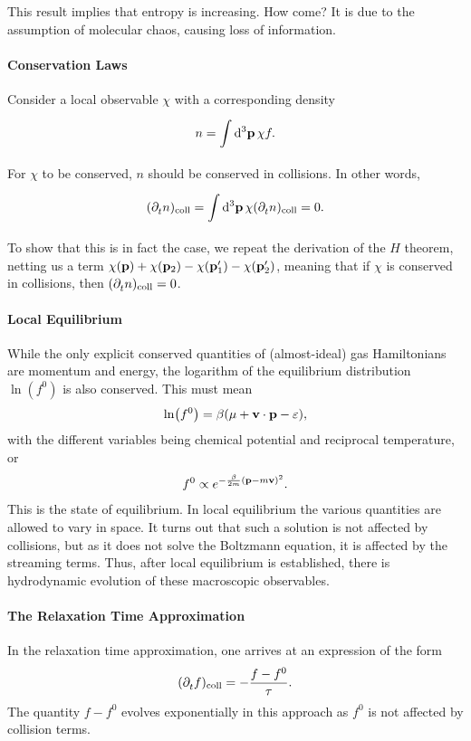 This result implies that entropy is increasing. How come? It is due to the assumption of molecular chaos, causing loss of information.

\paragraph{Conservation Laws}
Consider a local observable $\chi$ with a corresponding density
\begin{align*}
	n = \int\limits_{}^{}\dd[3]{\vb{p}}\chi f.
\end{align*}
For $\chi$ to be conserved, $n$ should be conserved in collisions. In other words,
\begin{align*}
	(\partial^{}_{t}{n})_{\text{coll}} = \int\limits_{}^{}\dd[3]{\vb{p}}\chi (\partial^{}_{t}{n})_{\text{coll}} = 0.
\end{align*}
To show that this is in fact the case, we repeat the derivation of the $H$ theorem, netting us a term $\chi(\vb{p}) + \chi(\vb{p}_{2}) - \chi(\vb{p}_{1}^{\prime}) - \chi(\vb{p}_{2}^{\prime})$, meaning that if $\chi$ is conserved in collisions, then $(\partial^{}_{t}{n})_{\text{coll}} = 0$.

\paragraph{Local Equilibrium}
While the only explicit conserved quantities of (almost-ideal) gas Hamiltonians are momentum and energy, the logarithm of the equilibrium distribution $\ln(f^{0})$ is also conserved. This must mean
\begin{align*}
	\ln(f^{0}) = \beta(\mu + \vb{v}\cdot\vb{p} - \varepsilon),
\end{align*}
with the different variables being chemical potential and reciprocal temperature, or
\begin{align*}
	f^{0} \propto e^{-\frac{\beta}{2m}(\vb{p} - m\vb{v})^{2}}.
\end{align*}
This is the state of equilibrium. In local equilibrium the various quantities are allowed to vary in space. It turns out that such a solution is not affected by collisions, but as it does not solve the Boltzmann equation, it is affected by the streaming terms. Thus, after local equilibrium is established, there is hydrodynamic evolution of these macroscopic observables.

\paragraph{The Relaxation Time Approximation}
In the relaxation time approximation, one arrives at an expression of the form
\begin{align*}
	(\partial^{}_{t}{f})_{\text{coll}} = -\frac{f - f^{0}}{\tau}.
\end{align*}
The quantity $f - f^{0}$ evolves exponentially in this approach as $f^{0}$ is not affected by collision terms.